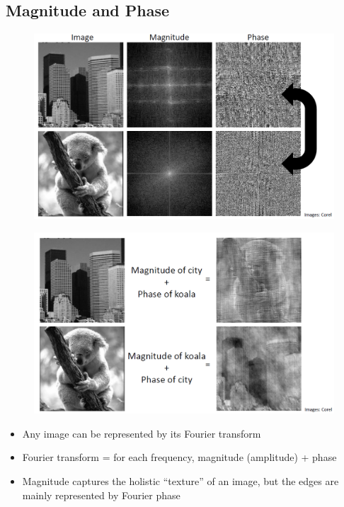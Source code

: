 \documentclass[11pt]{article}
\begin{document}
\subsection{Magnitude and Phase}
\begin{figure}[bht!]
  \centering
  \includegraphics[width=\textwidth]{images/magnpha.png}
\end{figure}
\begin{figure}[bht!]
  \centering
  \includegraphics[width=\textwidth]{images/magnpha2.png}
\end{figure}
\begin{itemize}
  \item Any image can be represented by its Fourier transform
  \item Fourier transform = for each frequency, magnitude (amplitude) + phase
  \item Magnitude captures the holistic “texture” of an image, but the edges are mainly represented by Fourier phase
\end{itemize}
\end{document}
